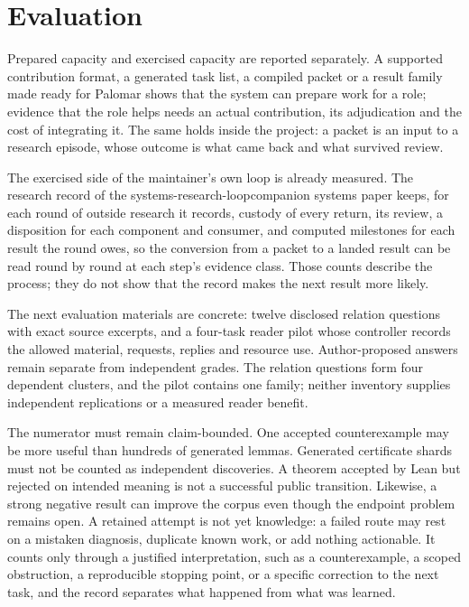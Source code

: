 \documentclass[10pt]{article}
\begin{document}
\section{Evaluation}\label{sec:evaluation}

Prepared capacity and exercised capacity are reported separately. A supported
contribution format, a generated task list, a compiled packet or a result
family made ready for Palomar shows that the system can prepare work for a
role; evidence that the role helps needs an actual contribution, its
adjudication and the cost of integrating it. The same holds inside the
project: a packet is an input to a research episode, whose outcome is what came
back and what survived review.

The exercised side of the maintainer's own loop is already measured. The
research record of the
%
{systems-research-loop}{companion systems paper} keeps, for each round of
outside research it records, custody of every return, its review, a disposition for each
component and consumer, and computed milestones for each result the round owes,
so the conversion from a packet to a landed result can be read round by round
at each step's evidence class. Those counts describe the process; they do not
show that the record makes the next result more likely.

The next evaluation materials are concrete: twelve disclosed relation
questions with exact source excerpts, and a four-task reader pilot whose
controller records the allowed material, requests, replies and resource use.
Author-proposed answers remain separate from independent grades. The relation
questions form four dependent clusters, and the pilot contains one family;
neither inventory supplies independent replications or a measured reader benefit.

The numerator must remain claim-bounded.  One accepted counterexample may be
more useful than hundreds of generated lemmas.  Generated certificate shards
must not be counted as independent discoveries.  A theorem accepted by Lean
but rejected on intended meaning is not a successful public transition.
Likewise, a strong negative result can improve the corpus even though the
endpoint problem remains open.  A retained attempt is not yet knowledge: a
failed route may rest on a mistaken diagnosis, duplicate known work, or add
nothing actionable.  It counts only through a justified interpretation, such as
a counterexample, a scoped obstruction, a reproducible stopping point, or a
specific correction to the next task, and the record separates what happened
from what was learned.
\end{document}
